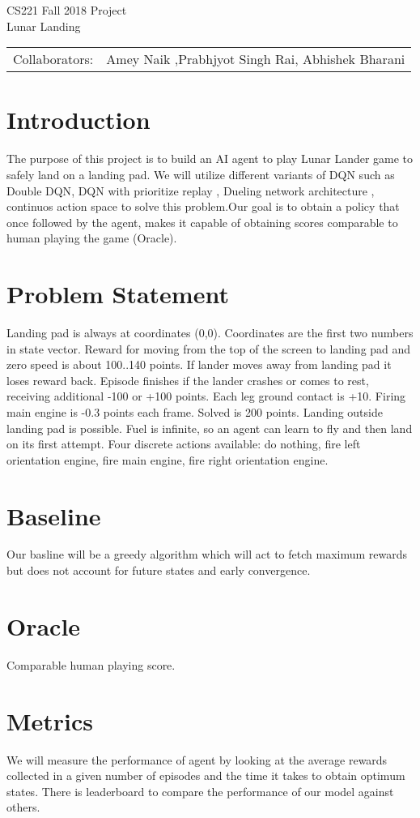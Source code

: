 \documentclass[12pt]{article}
\begin{document}
\begin{center}
{\Large CS221 Fall 2018 Project} \\
{\Large Lunar Landing}

\begin{tabular}{rl}
Collaborators: & Amey Naik ,Prabhjyot Singh Rai, Abhishek Bharani
\end{tabular}
\end{center}


\section{Introduction}

The purpose of this project is to build an AI agent to play Lunar Lander game to safely land on a landing pad. We will utilize different variants of DQN such as Double DQN\citep{DoubleQ-learning}, DQN with prioritize replay\citep{PrioritizedReplay} , Dueling network architecture \citep{Dueling}, continuos action space \citep{Continuos} to solve this problem.Our goal is to obtain a policy that once followed by the agent, makes it capable of obtaining scores comparable to human playing  the game  (Oracle).

\section{Problem Statement}
Landing pad is always at coordinates (0,0). Coordinates are the first two numbers in state vector. Reward for moving from the top of the screen to landing pad and zero speed is about 100..140 points. If lander moves away from landing pad it loses reward back. Episode finishes if the lander crashes or comes to rest, receiving additional -100 or +100 points. Each leg ground contact is +10. Firing main engine is -0.3 points each frame. Solved is 200 points. Landing outside landing pad is possible. Fuel is infinite, so an agent can learn to fly and then land on its first attempt. Four discrete actions available: do nothing, fire left orientation engine, fire main engine, fire right orientation engine.

\section{Baseline}
Our basline will be a greedy algorithm which will act to  fetch maximum rewards but does not account for future states and early convergence.

\section{Oracle}

Comparable human playing score.

\section{Metrics}
We will measure the performance of agent by looking at the average rewards collected in a given number of episodes and the time it takes to obtain optimum states. There is leaderboard to compare the performance of our model against others.




\end{document}
